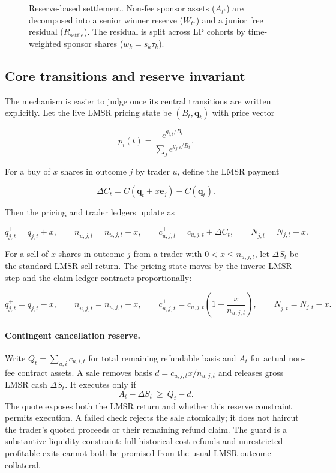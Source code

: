 \documentclass[10pt]{article}
\begin{document}
\begin{figure}[t]
\centering
\resizebox{\linewidth}{!}{}
\caption{Reserve-based settlement. Non-fee sponsor assets ($A_{t^\star}$) are decomposed into a senior winner reserve ($W_{t^\star}$) and a junior free residual ($R_{\mathrm{settle}}$). The residual is split across LP cohorts by time-weighted sponsor shares ($w_k = s_k \tau_k$).}
\label{fig:waterfall}
\end{figure}

\subsection{Core transitions and reserve invariant}

The mechanism is easier to judge once its central transitions are written explicitly. Let the live LMSR pricing state be $(B_t,\mathbf{q}_t)$ with price vector

\[
p_i(t) = \frac{e^{q_{i,t}/B_t}}{\sum_j e^{q_{j,t}/B_t}}.
\]

For a buy of $x$ shares in outcome $j$ by trader $u$, define the LMSR payment

\[
\Delta C_t = C(\mathbf{q}_t + x \mathbf{e}_j) - C(\mathbf{q}_t).
\]

Then the pricing and trader ledgers update as

\[
q_{j,t}^{+} = q_{j,t} + x,
\qquad
n_{u,j,t}^{+} = n_{u,j,t} + x,
\qquad
c_{u,j,t}^{+} = c_{u,j,t} + \Delta C_t,
\qquad
N_{j,t}^{+} = N_{j,t} + x.
\]

For a sell of $x$ shares in outcome $j$ from a trader with $0 < x \le n_{u,j,t}$, let $\Delta S_t$ be the standard LMSR sell return. The pricing state moves by the inverse LMSR step and the claim ledger contracts proportionally:

\[
q_{j,t}^{+} = q_{j,t} - x,
\qquad
n_{u,j,t}^{+} = n_{u,j,t} - x,
\qquad
c_{u,j,t}^{+} = c_{u,j,t}\left(1-\frac{x}{n_{u,j,t}}\right),
\qquad
N_{j,t}^{+} = N_{j,t} - x.
\]

\paragraph{Contingent cancellation reserve.}
Write $Q_t=\sum_{u,i}c_{u,i,t}$ for total remaining refundable basis and $A_t$ for actual non-fee contract assets. A sale removes basis $d=c_{u,j,t}x/n_{u,j,t}$ and releases gross LMSR cash $\Delta S_t$. It executes only if
\begin{equation}
\label{eq:refundguard}
 A_t-\Delta S_t\ \ge\ Q_t-d.
\end{equation}
The quote exposes both the LMSR return and whether this reserve constraint permits execution. A failed check rejects the sale atomically; it does not haircut the trader's quoted proceeds or their remaining refund claim. The guard is a substantive liquidity constraint: full historical-cost refunds and unrestricted profitable exits cannot both be promised from the usual LMSR outcome collateral.
\end{document}
